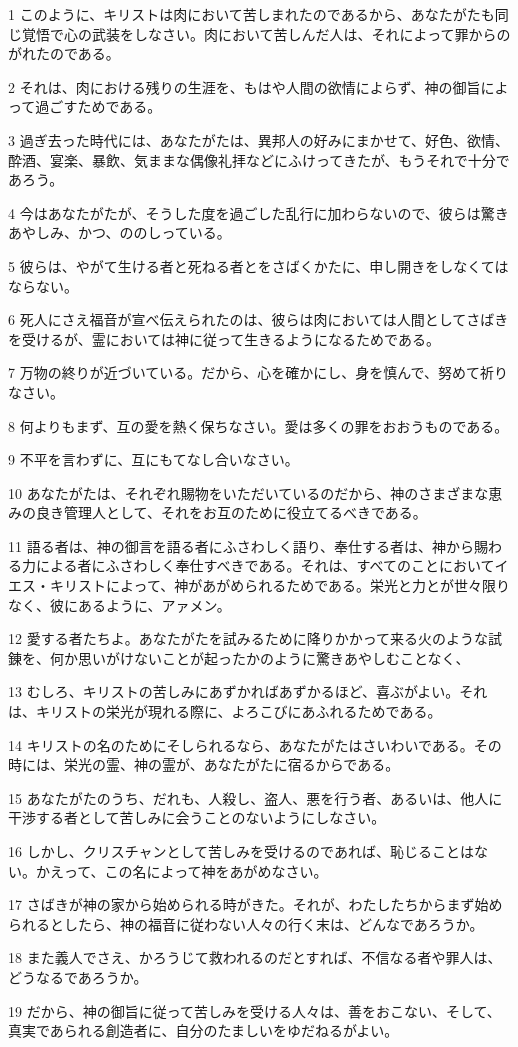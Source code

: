 \par 1 このように、キリストは肉において苦しまれたのであるから、あなたがたも同じ覚悟で心の武装をしなさい。肉において苦しんだ人は、それによって罪からのがれたのである。
\par 2 それは、肉における残りの生涯を、もはや人間の欲情によらず、神の御旨によって過ごすためである。
\par 3 過ぎ去った時代には、あなたがたは、異邦人の好みにまかせて、好色、欲情、酔酒、宴楽、暴飲、気ままな偶像礼拝などにふけってきたが、もうそれで十分であろう。
\par 4 今はあなたがたが、そうした度を過ごした乱行に加わらないので、彼らは驚きあやしみ、かつ、ののしっている。
\par 5 彼らは、やがて生ける者と死ねる者とをさばくかたに、申し開きをしなくてはならない。
\par 6 死人にさえ福音が宣べ伝えられたのは、彼らは肉においては人間としてさばきを受けるが、霊においては神に従って生きるようになるためである。
\par 7 万物の終りが近づいている。だから、心を確かにし、身を慎んで、努めて祈りなさい。
\par 8 何よりもまず、互の愛を熱く保ちなさい。愛は多くの罪をおおうものである。
\par 9 不平を言わずに、互にもてなし合いなさい。
\par 10 あなたがたは、それぞれ賜物をいただいているのだから、神のさまざまな恵みの良き管理人として、それをお互のために役立てるべきである。
\par 11 語る者は、神の御言を語る者にふさわしく語り、奉仕する者は、神から賜わる力による者にふさわしく奉仕すべきである。それは、すべてのことにおいてイエス・キリストによって、神があがめられるためである。栄光と力とが世々限りなく、彼にあるように、アァメン。
\par 12 愛する者たちよ。あなたがたを試みるために降りかかって来る火のような試錬を、何か思いがけないことが起ったかのように驚きあやしむことなく、
\par 13 むしろ、キリストの苦しみにあずかればあずかるほど、喜ぶがよい。それは、キリストの栄光が現れる際に、よろこびにあふれるためである。
\par 14 キリストの名のためにそしられるなら、あなたがたはさいわいである。その時には、栄光の霊、神の霊が、あなたがたに宿るからである。
\par 15 あなたがたのうち、だれも、人殺し、盗人、悪を行う者、あるいは、他人に干渉する者として苦しみに会うことのないようにしなさい。
\par 16 しかし、クリスチャンとして苦しみを受けるのであれば、恥じることはない。かえって、この名によって神をあがめなさい。
\par 17 さばきが神の家から始められる時がきた。それが、わたしたちからまず始められるとしたら、神の福音に従わない人々の行く末は、どんなであろうか。
\par 18 また義人でさえ、かろうじて救われるのだとすれば、不信なる者や罪人は、どうなるであろうか。
\par 19 だから、神の御旨に従って苦しみを受ける人々は、善をおこない、そして、真実であられる創造者に、自分のたましいをゆだねるがよい。

